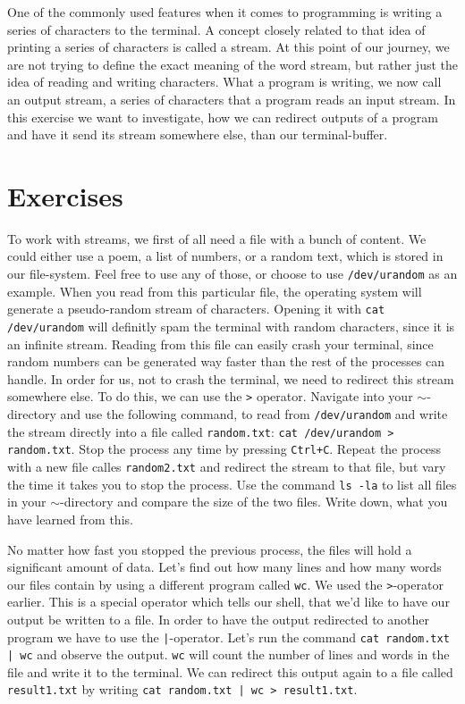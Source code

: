 \documentclass{dcbl/challenge}
\begin{document}
One of the commonly used features when it comes to programming is writing a series of characters to the terminal.
A concept closely related to that idea of printing a series of characters is called a stream.
At this point of our journey, we are not trying to define the exact meaning of the word stream, but rather just the idea of reading and writing characters.
What a program is writing, we now call an output stream, a series of characters that a program reads an input stream.
In this exercise we want to investigate, how we can redirect outputs of a program and have it send its stream somewhere else, than our terminal-buffer.

\section*{Exercises}
\begin{aufgabe}
    To work with streams, we first of all need a file with a bunch of content. 
    We could either use a poem, a list of numbers, or a random text, which is stored in our file-system.
    Feel free to use any of those, or choose to use \texttt{/dev/urandom} as an example.
    When you read from this particular file, the operating system will generate a pseudo-random stream of characters. 
    Opening it with \texttt{cat /dev/urandom} will definitly spam the terminal with random characters, since it is an infinite stream.
    Reading from this file can easily crash your terminal, since random numbers can be generated way faster than the rest of the processes can handle.
    In order for us, not to crash the terminal, we need to redirect this stream somewhere else.
    To do this, we can use the \texttt{>} operator.
    Navigate into your \texttt{$\sim$}-directory and use the following command, to read from \texttt{/dev/urandom} and write the stream directly into a file called \texttt{random.txt}: \texttt{cat /dev/urandom > random.txt}.
    Stop the process any time by pressing \texttt{Ctrl+C}.
    Repeat the process with a new file calles \texttt{random2.txt} and redirect the stream to that file, but vary the time it takes you to stop the process.
    Use the command \texttt{ls -la} to list all files in your \texttt{$\sim$}-directory and compare the size of the two files.
    Write down, what you have learned from this.
\end{aufgabe}

\begin{aufgabe}
    No matter how fast you stopped the previous process, the files will hold a significant amount of data. 
    Let's find out how many lines and how many words our files contain by using a different program called \texttt{wc}.
    We used the \texttt{>}-operator earlier. 
    This is a special operator which tells our shell, that we'd like to have our output be written to a file.
    In order to have the output redirected to another program we have to use the \texttt{|}-operator.
    Let's run the command \texttt{cat random.txt | wc} and observe the output.
    \texttt{wc} will count the number of lines and words in the file and write it to the terminal.
    We can redirect this output again to a file called \texttt{result1.txt} by writing \texttt{cat random.txt | wc > result1.txt}.
\end{aufgabe}
\end{document}
